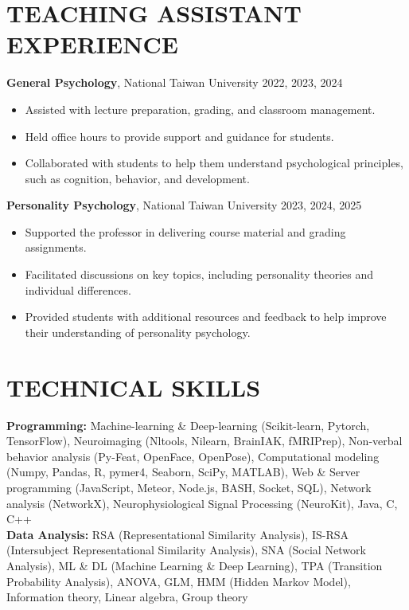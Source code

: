 \documentclass[a4paper,12pt]{article}
\newcommand{\sectionspace}{0pt} %
\newcommand{\itemspace}{7pt} %
\begin{document}
\vspace{\sectionspace}

\section*{TEACHING ASSISTANT EXPERIENCE}

\noindent\textbf{General Psychology}, National Taiwan University  \hfill 2022, 2023, 2024
\begin{itemize}
    \item Assisted with lecture preparation, grading, and classroom management.
    \item Held office hours to provide support and guidance for students.
    \item Collaborated with students to help them understand psychological principles, such as cognition, behavior, and development.
\end{itemize}

\noindent\textbf{Personality Psychology}, National Taiwan University \hfill 2023, 2024, 2025
\begin{itemize}
    \item Supported the professor in delivering course material and grading assignments.
    \item Facilitated discussions on key topics, including personality theories and individual differences.
    \item Provided students with additional resources and feedback to help improve their understanding of personality psychology.
\end{itemize}

\vspace{7pt}

\section*{TECHNICAL SKILLS}
\textbf{Programming:} Machine-learning \& Deep-learning (Scikit-learn, Pytorch, TensorFlow), Neuroimaging (Nltools, Nilearn, BrainIAK, fMRIPrep), Non-verbal behavior analysis (Py-Feat, OpenFace, OpenPose), Computational modeling (Numpy, Pandas, R, pymer4, Seaborn, SciPy, MATLAB), Web \& Server programming (JavaScript, Meteor, Node.js, BASH, Socket, SQL), Network analysis (NetworkX), Neurophysiological Signal Processing (NeuroKit), Java, C, C++ \\[\itemspace]
\noindent\textbf{Data Analysis:} RSA (Representational Similarity Analysis), IS-RSA (Intersubject Representational Similarity Analysis), SNA (Social Network Analysis), ML \& DL (Machine Learning \& Deep Learning), TPA (Transition Probability Analysis), ANOVA, GLM, HMM (Hidden Markov Model), Information theory, Linear algebra, Group theory

\thispagestyle{lastupdate}
\end{document}
